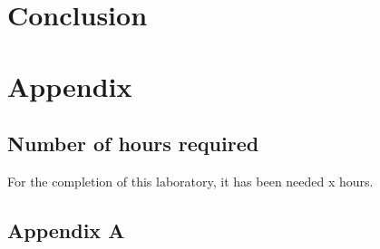 \documentclass{article}
\begin{document}




\section{Conclusion}



\newpage
\section{Appendix}
\subsection{Number of hours required}
For the completion of this laboratory, it has been needed x hours. 
\subsection{Appendix A}
% 
\end{document}
